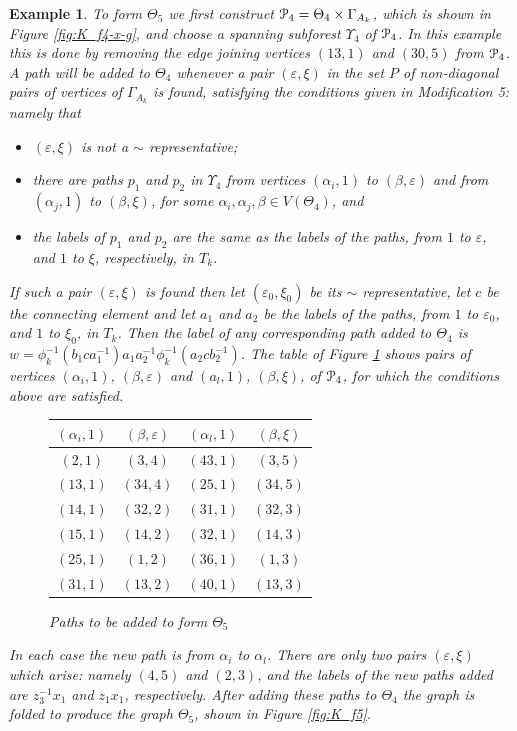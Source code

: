 \documentclass[a4paper,12pt]{article}
\renewcommand{\a}{\alpha }
\renewcommand{\b}{\beta }
\newcommand{\G}{\Gamma }
\newcommand{\e}{\varepsilon }
\newcommand{\T}{\Theta }
\newcommand{\U}{\Upsilon }
\newcommand{\cP}{{\cal{P}}}
\newtheorem{exam}[theorem]{Example}
\newenvironment{example}{\begin{exam} \rm}{\end{exam}}
\numberwithin{equation}{section}
\numberwithin{figure}{section}
\begin{document}
\begin{example}
To form $\T_5$ we first construct $\cP_4=\T_4\times \G_{A_k}$,
which is shown in Figure \ref{fig:K_f4-x-g}, and choose a spanning
subforest $\U_4$ of $\cP_4$. In this example this is done by
removing the edge  joining vertices $(13,1)$ and $(30,5)$ from
$\cP_4$. A path will be added to $\T_4$ whenever a pair $(\e,\xi)$
in the set $P$ of non-diagonal pairs of vertices of $\G_{A_k}$ is
found, satisfying the conditions given in Modification 5: namely
that
\begin{itemize}
\item
$(\e,\xi)$ is not a $\sim$ representative;
\item  there are paths $p_1$ and $p_2$ in $\U_4$ from
vertices $(\a_i,1)$ to $(\b,\e)$ and from $(\a_j,1)$ to $(\b,\xi)$, for some $\a_i, \a_j, \b\in V(\T_4)$,
and
\item
the labels of $p_1$ and $p_2$  are the same as the labels of the paths, from $1$ to $\e$, and $1$ to $\xi$,
respectively, in $T_k$.
\end{itemize}
If  such a pair $(\e,\xi)$ is found then let $(\e_0,\xi_0)$ be its $\sim$ representative, let
$c$ be the connecting element and let $a_1$ and $a_2$ be the labels of  the paths, from
$1$ to $\e_0$, and $1$ to $\xi_0$, in $T_k$. Then the label of any corresponding  path added to
$\T_4$ is $w=\phi_k^{-1}(b_1ca_1^{-1})a_1a_2^{-1}\phi_k^{-1}(a_2cb_2^{-1})$.
The table of Figure \ref{tab:T5} shows pairs of vertices $(\a_i,1)$, $(\b,\e)$ and $(a_l,1)$, $(\b,\xi)$,
of $\cP_4$, for which the conditions above are satisfied.
\begin{figure}
\begin{center}
\renewcommand{\arraystretch}{1.5}
\begin{tabular}{|c|c||c|c|}
\hline
$(\a_i,1)$& $(\b,\e)$ & $(\a_l,1)$ & $(\b,\xi)$ \\\hline\hline
$(2,1)$ & $(3,4)$ & $(43,1)$ & $(3,5)$ \\\hline
$(13,1)$ & $(34,4)$ & $(25,1)$ & $(34,5)$ \\\hline
$(14,1)$ & $(32,2)$ & $(31,1)$ & $(32,3)$ \\\hline
$(15,1)$ & $(14,2)$ & $(32,1)$ & $(14,3)$ \\\hline
$(25,1)$ & $(1,2)$ & $(36,1)$ & $(1,3)$ \\\hline
$(31,1)$ & $(13,2)$ & $(40,1)$ & $(13,3)$ \\\hline
\end{tabular}
\renewcommand{\arraystretch}{1}
\end{center}
\caption{Paths to be added to form $\T_5$}
\label{tab:T5}
\end{figure}
In each
case the new path is from $\a_i$ to $\a_l$. There are only
 two pairs  $(\e,\xi)$ which arise: namely $(4,5)$ and $(2,3)$, and the labels of the new paths
added  are $z_3^{-1}x_1$ and $z_1x_1$, respectively. After adding these paths to $\T_4$ the graph is folded to
produce the graph $\T_5$, shown in Figure \ref{fig:K_f5}.



\end{example}
\end{document}
